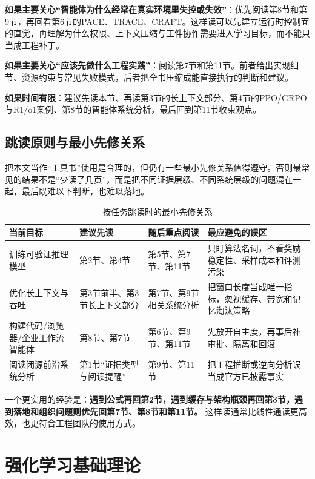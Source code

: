 \documentclass[12pt,a4paper]{article}
\begin{document}
\textbf{如果主要关心“智能体为什么经常在真实环境里失控或失效”}：优先阅读第8节和第9节，再回看第6节的PACE、TRACE、CRAFT。这样读可以先建立运行时控制面的直觉，再理解为什么权限、上下文压缩与工件协作需要进入学习目标，而不能只当成工程补丁。

\textbf{如果主要关心“应该先做什么工程实践”}：阅读第7节和第11节。前者给出实现细节、资源约束与常见失败模式，后者把全书压缩成能直接执行的判断和建议。

\textbf{如果时间有限}：建议先读本节、再读第3节的长上下文部分、第4节的PPO/GRPO与R1/o1案例、第8节的智能体系统分析，最后回到第11节收束观点。

\subsection{跳读原则与最小先修关系}

把本文当作“工具书”使用是合理的，但仍有一些最小先修关系值得遵守。否则最常见的结果不是“少读了几页”，而是把不同证据层级、不同系统层级的问题混在一起，最后既难以下判断，也难以落地。

\begin{table}[H]
\centering
\small
\caption{按任务跳读时的最小先修关系}
\begin{tabular}{p{3.0cm}p{3.1cm}p{4.0cm}p{3.4cm}}
\toprule
\textbf{当前目标} & \textbf{建议先读} & \textbf{随后重点阅读} & \textbf{最应避免的误区} \\
\midrule
训练可验证推理模型 & 第2节、第4节 & 第5节、第7节、第11节 & 只盯算法名词，不看奖励稳定性、采样成本和评测污染 \\
优化长上下文与吞吐 & 第3节前半、第3节长上下文部分 & 第7节、第9节相关系统分析 & 把窗口长度当成唯一指标，忽视缓存、带宽和记忆淘汰策略 \\
构建代码/浏览器/企业工作流智能体 & 第8节、第7节 & 第6节、第9节、第11节 & 先放开自主度，再事后补审批、隔离和回滚 \\
阅读闭源前沿系统分析 & 第1节“证据类型与阅读提醒” & 第9节、第11节 & 把工程推断或逆向分析误当成官方已披露事实 \\
\bottomrule
\end{tabular}
\end{table}

一个更实用的经验是：\textbf{遇到公式再回第2节，遇到缓存与架构瓶颈再回第3节，遇到落地和组织问题则优先回第7节、第8节和第11节。} 这样读通常比线性通读更高效，也更符合工程团队的使用方式。

\section{强化学习基础理论}
\end{document}
